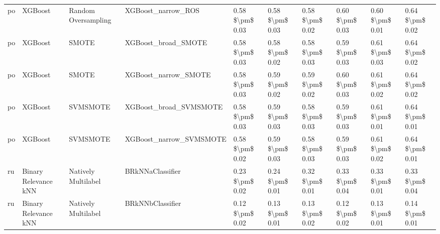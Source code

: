 \begin{tabular}{llllllllll}
      po &                         XGBoost &           Random Oversampling &                           XGBoost\_narrow\_ROS & 0.58 \$\textbackslash pm\$ 0.03 &           0.58 \$\textbackslash pm\$ 0.03 &       0.58 \$\textbackslash pm\$ 0.02 &        0.60 \$\textbackslash pm\$ 0.03 &                         0.60 \$\textbackslash pm\$ 0.01 &     0.64 \$\textbackslash pm\$ 0.02 \\
      po &                         XGBoost &                         SMOTE &                          XGBoost\_broad\_SMOTE & 0.58 \$\textbackslash pm\$ 0.03 &           0.58 \$\textbackslash pm\$ 0.02 &       0.58 \$\textbackslash pm\$ 0.03 &        0.59 \$\textbackslash pm\$ 0.03 &                         0.61 \$\textbackslash pm\$ 0.03 &     0.64 \$\textbackslash pm\$ 0.02 \\
      po &                         XGBoost &                         SMOTE &                         XGBoost\_narrow\_SMOTE & 0.58 \$\textbackslash pm\$ 0.03 &           0.59 \$\textbackslash pm\$ 0.02 &       0.59 \$\textbackslash pm\$ 0.02 &        0.60 \$\textbackslash pm\$ 0.03 &                         0.61 \$\textbackslash pm\$ 0.02 &     0.64 \$\textbackslash pm\$ 0.02 \\
      po &                         XGBoost &                      SVMSMOTE &                       XGBoost\_broad\_SVMSMOTE & 0.58 \$\textbackslash pm\$ 0.03 &           0.59 \$\textbackslash pm\$ 0.03 &       0.58 \$\textbackslash pm\$ 0.03 &        0.59 \$\textbackslash pm\$ 0.03 &                         0.61 \$\textbackslash pm\$ 0.01 &     0.64 \$\textbackslash pm\$ 0.01 \\
      po &                         XGBoost &                      SVMSMOTE &                      XGBoost\_narrow\_SVMSMOTE & 0.58 \$\textbackslash pm\$ 0.02 &           0.59 \$\textbackslash pm\$ 0.03 &       0.58 \$\textbackslash pm\$ 0.03 &        0.59 \$\textbackslash pm\$ 0.03 &                         0.61 \$\textbackslash pm\$ 0.02 &     0.64 \$\textbackslash pm\$ 0.01 \\
      ru &            Binary Relevance kNN &           Natively Multilabel &                             BRkNNaClassifier & 0.23 \$\textbackslash pm\$ 0.02 &           0.24 \$\textbackslash pm\$ 0.01 &       0.32 \$\textbackslash pm\$ 0.01 &        0.33 \$\textbackslash pm\$ 0.04 &                         0.33 \$\textbackslash pm\$ 0.01 &     0.33 \$\textbackslash pm\$ 0.04 \\
      ru &            Binary Relevance kNN &           Natively Multilabel &                             BRkNNbClassifier & 0.12 \$\textbackslash pm\$ 0.02 &           0.13 \$\textbackslash pm\$ 0.01 &       0.13 \$\textbackslash pm\$ 0.02 &        0.12 \$\textbackslash pm\$ 0.02 &                         0.13 \$\textbackslash pm\$ 0.01 &     0.14 \$\textbackslash pm\$ 0.01 \\

\end{tabular}
